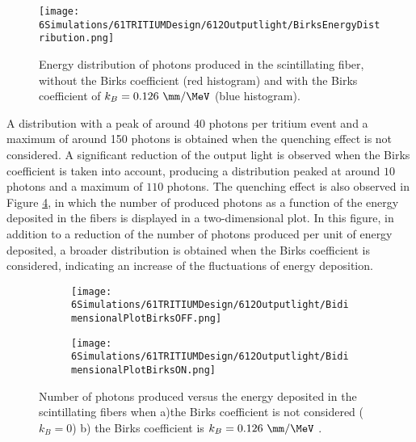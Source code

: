 \begin{figure}[h]
\centering
\texttt{[image: 6Simulations/61TRITIUMDesign/612Outputlight/BirksEnergyDistribution.png]}
\caption{Energy distribution of photons produced in the scintillating fiber, without the Birks coefficient (red histogram) and with the Birks coefficient of $k_B=0.126~\mm/\MeV$ (blue histogram)\cite{SimulationPaperCarlos}.\label{fig:BirksEffectinEnergyDistribution}}
\end{figure}  

A distribution with a peak of around 40 photons per tritium event and a maximum of around 150 photons is obtained when the quenching effect is not considered. A significant reduction of the output light is observed when the Birks coefficient is taken into account, producing a distribution peaked at around $10$ photons and a maximum of $110$ photons. The quenching effect is also observed in Figure \ref{fig:2DimPlotBirks}, in which the number of produced photons as a function of the energy deposited in the fibers is displayed in a two-dimensional plot. In this figure, in addition to a reduction of the number of photons produced per unit of energy deposited, a broader distribution is obtained when the Birks coefficient is considered, indicating an increase of the fluctuations of energy deposition.

\begin{figure}
\centering
    \begin{subfigure}[b]{0.4\textwidth}
    \centering
    \texttt{[image: 6Simulations/61TRITIUMDesign/612Outputlight/BidimensionalPlotBirksOFF.png]}  
    \caption{\label{subfig:2DimPlotNoBirks}}
    \end{subfigure}
    \hfill
    \begin{subfigure}[b]{0.4\textwidth}
    \centering
    \texttt{[image: 6Simulations/61TRITIUMDesign/612Outputlight/BidimensionalPlotBirksON.png]}  
    \caption{\label{subfig:2DimPlotBirks}}
    \end{subfigure}
 \caption{Number of photons produced versus the energy deposited in the scintillating fibers when a)the Birks coefficient is not considered ($k_B=0$) b) the Birks coefficient is $k_B=0.126~\mm/\MeV$ \cite{SimulationPaperCarlos}.}
 \label{fig:2DimPlotBirks}
\end{figure}